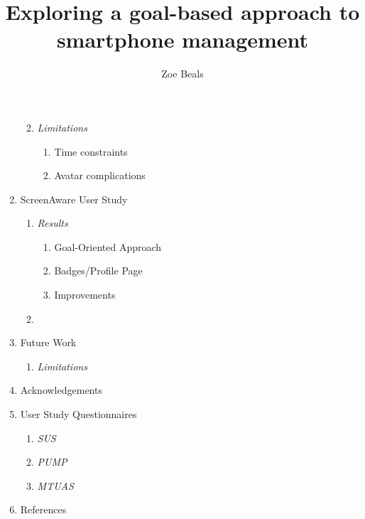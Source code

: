 \documentclass[12pt, title page, manuscript, nonacm]{acmart}
\begin{document}
\begin{enumerate}[label=\arabic*,leftmargin=*,labelsep=2ex,ref=\arabic*]
\begin{enumerate}[label*=.\arabic*,leftmargin=*,labelsep=2ex]
\begin{enumerate}[label*=.\arabic*,leftmargin=*,labelsep=2ex]
        \end{enumerate}
        \item \textit{Limitations} 
        \begin{enumerate}[label*=.\arabic*,leftmargin=*,labelsep=2ex]
            \item Time constraints 
            \item Avatar complications 
        \end{enumerate}
    \end{enumerate}
    \item ScreenAware User Study 
    \begin{enumerate}[label*=.\arabic*,leftmargin=*,labelsep=2ex]
        \item \textit{Results} 
        \begin{enumerate}[label*=.\arabic*,leftmargin=*,labelsep=2ex]
            \item Goal-Oriented Approach 
            \item Badges/Profile Page 
            \item Improvements 
        \end{enumerate}
        \item {} 
    \end{enumerate}
    \item Future Work 
    \begin{enumerate}[label*=.\arabic*,leftmargin=*,labelsep=2ex]
        \item \textit{Limitations} 
    \end{enumerate}
    \item Acknowledgements 
     \item User Study Questionnaires 
    \begin{enumerate}[label*=.\arabic*,leftmargin=*,labelsep=2ex]
        \item \textit{SUS} 
        \item \textit{PUMP} 
        \item \textit{MTUAS} 
    \end{enumerate}
    \item References 
   
\end{enumerate}
\title{Exploring a goal-based approach to smartphone management}
\author{Zoe Beals}
\newpage
\end{document}
